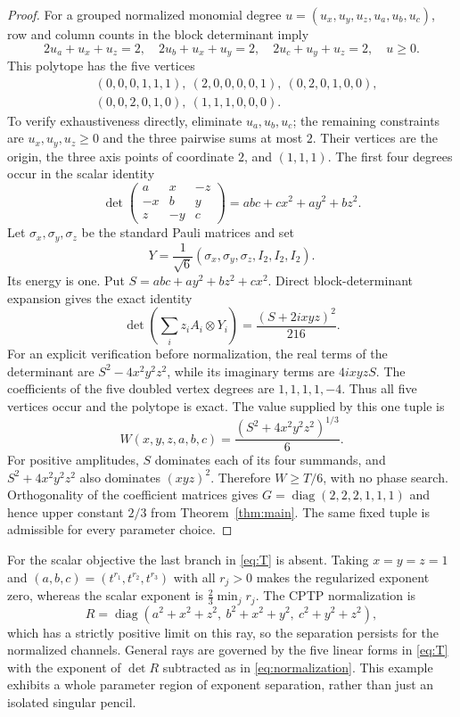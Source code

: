\documentclass[11pt]{article}
\begin{document}
\begin{proof}
For a grouped normalized monomial degree $u=(u_x,u_y,u_z,u_a,u_b,u_c)$, row and column counts in the block determinant imply
\[
 2u_a+u_x+u_z=2,\quad
 2u_b+u_x+u_y=2,\quad
 2u_c+u_y+u_z=2,\quad u\ge0.
\]
This polytope has the five vertices
\begin{align*}
 &(0,0,0,1,1,1),\ (2,0,0,0,0,1),\ (0,2,0,1,0,0),\\
 &(0,0,2,0,1,0),\ (1,1,1,0,0,0).
\end{align*}
To verify exhaustiveness directly, eliminate $u_a,u_b,u_c$; the remaining constraints are $u_x,u_y,u_z\ge0$ and the three pairwise sums at most $2$. Their vertices are the origin, the three axis points of coordinate $2$, and $(1,1,1)$.
The first four degrees occur in the scalar identity
\[
 \det\begin{pmatrix}a&x&-z\\-x&b&y\\z&-y&c\end{pmatrix}
 =abc+cx^2+ay^2+bz^2.
\]
Let $\sigma_x,\sigma_y,\sigma_z$ be the standard Pauli matrices and set
\[
 Y=\frac1{\sqrt6}(\sigma_x,\sigma_y,\sigma_z,I_2,I_2,I_2).
\]
Its energy is one. Put $S=abc+ay^2+bz^2+cx^2$. Direct block-determinant expansion gives the exact identity
\begin{equation}
 \det\left(\sum_i z_i A_i\otimes Y_i\right)
 =\frac{(S+2i xyz)^2}{216}.\label{eq:factor}
\end{equation}
For an explicit verification before normalization, the real terms of the determinant are $S^2-4x^2y^2z^2$, while its imaginary terms are $4i xyzS$. The coefficients of the five doubled vertex degrees are $1,1,1,1,-4$. Thus all five vertices occur and the polytope is exact.
The value supplied by this one tuple is
\begin{equation}
 W(x,y,z,a,b,c)=\frac{(S^2+4x^2y^2z^2)^{1/3}}6.\label{eq:witness}
\end{equation}
For positive amplitudes, $S$ dominates each of its four summands, and $S^2+4x^2y^2z^2$ also dominates $(xyz)^2$. Therefore $W\ge T/6$, with no phase search. Orthogonality of the coefficient matrices gives
$G=\operatorname{diag}(2,2,2,1,1,1)$ and hence upper constant $2/3$ from Theorem~\ref{thm:main}. The same fixed tuple is admissible for every parameter choice.
\end{proof}
For the scalar objective the last branch in \eqref{eq:T} is absent. Taking
$x=y=z=1$ and $(a,b,c)=(t^{r_1},t^{r_2},t^{r_3})$ with all $r_j>0$ makes the regularized exponent zero, whereas the scalar exponent is
$\frac23\min_j r_j$. The CPTP normalization is
\[
 R=\operatorname{diag}(a^2+x^2+z^2,\ b^2+x^2+y^2,\ c^2+y^2+z^2),
\]
which has a strictly positive limit on this ray, so the separation persists for the normalized channels. General rays are governed by the five linear forms in \eqref{eq:T} with the exponent of $\det R$ subtracted as in \eqref{eq:normalization}. This example exhibits a whole parameter region of exponent separation, rather than just an isolated singular pencil.
\end{document}
